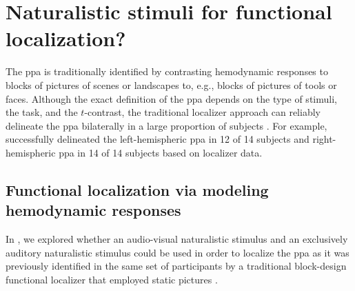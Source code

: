 




\pagebreak

\section{Naturalistic stimuli for functional localization?}



%
The \ac{ppa} is traditionally identified by contrasting hemodynamic responses to
blocks of pictures of scenes or landscapes to, e.g., blocks of pictures of tools
or faces.
%
Although the exact definition of the \ac{ppa} depends on the type of stimuli,
the task, and the $t$-contrast, the traditional localizer approach can reliably
delineate the \ac{ppa} bilaterally in a large proportion of subjects
\citep{zhen2017quantifying}.
%
For example, \citet{sengupta2016extension} successfully delineated the
left-hemispheric \ac{ppa} in 12 of 14 subjects and right-hemispheric \ac{ppa} in
14 of 14 subjects based on localizer data.


\subsection{Functional localization via modeling hemodynamic responses}


In \citet{haeusler2022processing}, we explored whether an audio-visual
naturalistic stimulus and an exclusively auditory naturalistic stimulus could be
used in order to localize the \ac{ppa} as it was previously identified in the
same set of participants by a traditional block-design functional localizer that
employed static pictures \citep{sengupta2016extension}.


